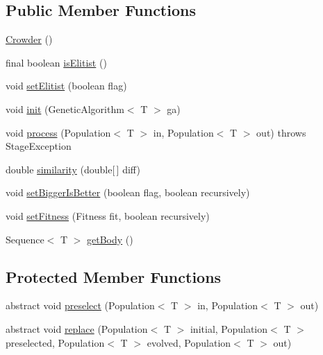 \subsection*{Public Member Functions}
\begin{DoxyCompactItemize}
\item 
\hyperlink{classjenes_1_1stage_1_1operator_1_1_crowder_3_01_t_01extends_01_chromosome_01_4_a6e23e3544b98e1a415c53fcedd541df5}{Crowder} ()
\item 
final boolean \hyperlink{classjenes_1_1stage_1_1operator_1_1_crowder_3_01_t_01extends_01_chromosome_01_4_ab9bb2a8d6bf09a51158ef49917095913}{is\-Elitist} ()
\item 
void \hyperlink{classjenes_1_1stage_1_1operator_1_1_crowder_3_01_t_01extends_01_chromosome_01_4_ad995907f114cdd40eb03d53f05734b8c}{set\-Elitist} (boolean flag)
\item 
void \hyperlink{classjenes_1_1stage_1_1operator_1_1_crowder_3_01_t_01extends_01_chromosome_01_4_a345ecb8e82d64130d171fb785f2702e6}{init} (Genetic\-Algorithm$<$ T $>$ ga)
\item 
void \hyperlink{classjenes_1_1stage_1_1operator_1_1_crowder_3_01_t_01extends_01_chromosome_01_4_a21f0859b05e06d7ee4b979d5a2d559d7}{process} (Population$<$ T $>$ in, Population$<$ T $>$ out)  throws Stage\-Exception 
\item 
double \hyperlink{classjenes_1_1stage_1_1operator_1_1_crowder_3_01_t_01extends_01_chromosome_01_4_a99b3aaad504589efa9c408fc1b4e2fa1}{similarity} (double\mbox{[}$\,$\mbox{]} diff)
\item 
void \hyperlink{classjenes_1_1stage_1_1operator_1_1_crowder_3_01_t_01extends_01_chromosome_01_4_a65ef754570b25a6f14fbd78e6c08c4f9}{set\-Bigger\-Is\-Better} (boolean flag, boolean recursively)
\item 
void \hyperlink{classjenes_1_1stage_1_1operator_1_1_crowder_3_01_t_01extends_01_chromosome_01_4_ac6c89c383d27754be63fabc951e11dc8}{set\-Fitness} (Fitness fit, boolean recursively)
\item 
Sequence$<$ T $>$ \hyperlink{classjenes_1_1stage_1_1operator_1_1_crowder_3_01_t_01extends_01_chromosome_01_4_a4b24910de47aff7c5a709846af74b199}{get\-Body} ()
\end{DoxyCompactItemize}
\subsection*{Protected Member Functions}
\begin{DoxyCompactItemize}
\item 
abstract void \hyperlink{classjenes_1_1stage_1_1operator_1_1_crowder_3_01_t_01extends_01_chromosome_01_4_ae72da3620314eba33b17297eb6a52aa0}{preselect} (Population$<$ T $>$ in, Population$<$ T $>$ out)
\item 
abstract void \hyperlink{classjenes_1_1stage_1_1operator_1_1_crowder_3_01_t_01extends_01_chromosome_01_4_a2eec13cd60faaeefc6bb00302831740f}{replace} (Population$<$ T $>$ initial, Population$<$ T $>$ preselected, Population$<$ T $>$ evolved, Population$<$ T $>$ out)
\end{DoxyCompactItemize}
